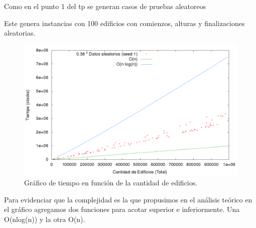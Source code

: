 Como en el punto 1 del tp se generan casos de pruebas aleatoreos

Este genera instancias con 100 edificios con comienzos, alturas y finalizaciones aleatorias.

\begin{figure}[H]
\begin{center}
\includegraphics[scale=0.35]{./imagenes/ej2_chartRendimiento.png}
\caption{Gr\'afico de tiempo en funci\'on de la cantidad de edificios.}
\end{center}
\end{figure}

Para evidenciar que la complejidad es la que propusimos en el análisis teórico en el gráfico agregamos dos funciones para acotar superior e inferiormente. Una O(nlog(n)) y la otra O(n).